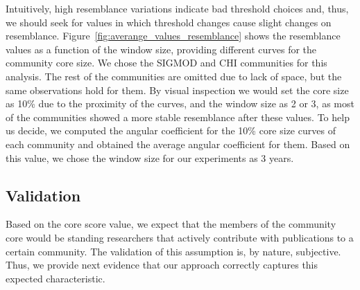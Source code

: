 Intuitively, high resemblance variations indicate bad threshold choices and, thus, we should seek for values in which threshold changes cause slight changes on resemblance.
Figure~\ref{fig:averange_values_resemblance} shows the resemblance values as a function of the window size, providing different curves for the community core size.  We chose the
SIGMOD and CHI communities for this analysis. The rest of the communities are omitted due to lack of space, but the same observations hold for them. By visual inspection we would set the core
size as 10\% due to the proximity of the curves, and the window size as 2 or 3, as most of the communities showed a more stable resemblance after these values. To help us decide, we
computed the angular coefficient for the 10\% core size curves of each community and obtained the average angular coefficient for them.  Based on this value, we chose the window
size for our experiments as 3 years.


\subsection{Validation}

Based on the core score value, we expect that the members of the community core would be standing researchers that actively contribute with publications to a certain community.
The validation of this assumption is, by nature, subjective.  Thus, we provide next evidence that our approach correctly captures this expected characteristic.



